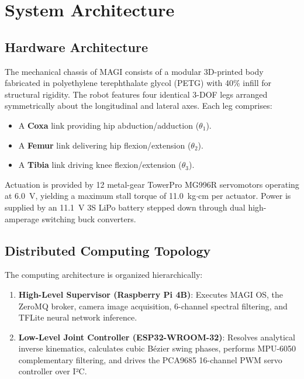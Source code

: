 \documentclass[conference]{IEEEtran}
\begin{document}
\section{System Architecture}

\subsection{Hardware Architecture}
The mechanical chassis of MAGI consists of a modular 3D-printed body fabricated in polyethylene terephthalate glycol (PETG) with 40\% infill for structural rigidity. The robot features four identical 3-DOF legs arranged symmetrically about the longitudinal and lateral axes. Each leg comprises:
\begin{itemize}
    \item A \textbf{Coxa} link providing hip abduction/adduction ($\theta_1$).
    \item A \textbf{Femur} link delivering hip flexion/extension ($\theta_2$).
    \item A \textbf{Tibia} link driving knee flexion/extension ($\theta_3$).
\end{itemize}
Actuation is provided by 12 metal-gear TowerPro MG996R servomotors operating at 6.0~V, yielding a maximum stall torque of 11.0~kg$\cdot$cm per actuator. Power is supplied by an 11.1~V 3S LiPo battery stepped down through dual high-amperage switching buck converters.

\subsection{Distributed Computing Topology}
The computing architecture is organized hierarchically:
\begin{enumerate}
    \item \textbf{High-Level Supervisor (Raspberry Pi 4B)}: Executes MAGI OS, the ZeroMQ broker, camera image acquisition, 6-channel spectral filtering, and TFLite neural network inference.
    \item \textbf{Low-Level Joint Controller (ESP32-WROOM-32)}: Resolves analytical inverse kinematics, calculates cubic Bézier swing phases, performs MPU-6050 complementary filtering, and drives the PCA9685 16-channel PWM servo controller over I²C.
\end{enumerate}
\end{document}
